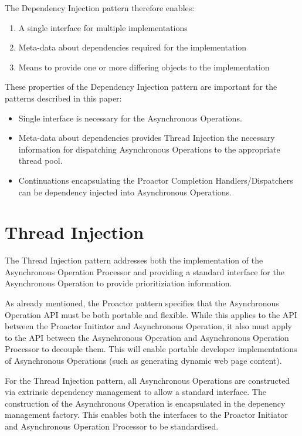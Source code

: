 \documentclass{article}
\begin{document}
The Dependency Injection pattern therefore enables:
\begin{enumerate}
  \item A single interface for multiple implementations
  \item Meta-data about dependencies required for the implementation
  \item Means to provide one or more differing objects to the implementation
\end{enumerate}

These properties of the Dependency Injection pattern are important for the
patterns described in this paper:
\begin{itemize}
  \item Single interface is necessary for the Asynchronous Operations.
  \item Meta-data about dependencies provides Thread Injection the necessary information for dispatching Asynchronous Operations to the appropriate thread pool.
  \item Continuations encapsulating the Proactor Completion Handlers/Dispatchers can be dependency injected into Asynchronous Operations.
\end{itemize}


\section{Thread Injection}

The Thread Injection pattern addresses both the implementation of the
Asynchronous Operation Processor and providing a standard interface for the
Asynchronous Operation to provide prioritiziation information.

As already mentioned, the Proactor pattern specifies that the Asynchronous
Operation API must be both portable and flexible.  While this applies to the API
between the Proactor Initiator and Asynchronous Operation, it also must apply to
the API between the Asynchronous Operation and Asynchronous Operation Processor
to decouple them.  This will enable portable developer implementations of
Asynchronous Operations (such as generating dynamic web page content). 

For the Thread Injection pattern, all Asynchronous Operations are constructed
via extrinsic dependency management \cite{ioc} to allow a standard interface.
The construction of the Asynchronous Operation is encapsulated in the depenency
management factory.  This enables both the interfaces to the Proactor Initiator
and Asynchronous Operation Processor to be standardised.
\end{document}
